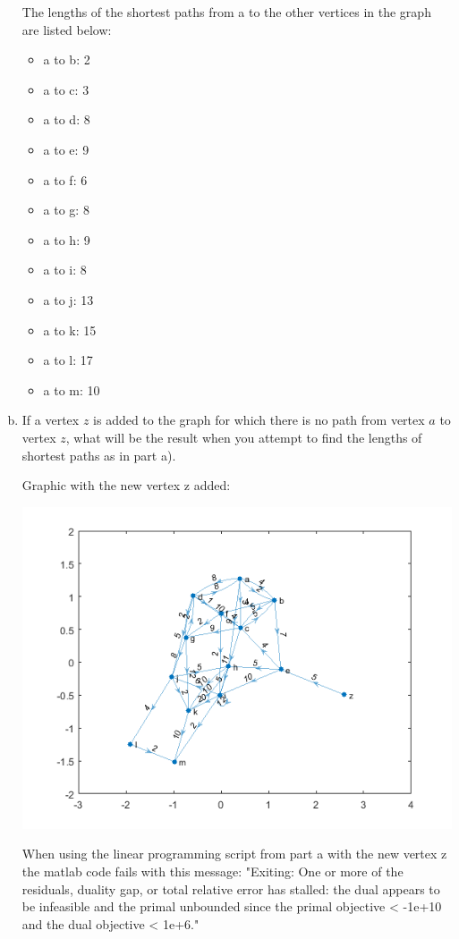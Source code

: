 \documentclass[../report/main.tex]{subfiles}
\begin{document}
\begin{enumerate}[a)]
    The lengths of the shortest paths from a to the other vertices in the graph are listed below:
    \begin{itemize}
        \item a to b: 2
        \item a to c: 3
        \item a to d: 8
        \item a to e: 9
        \item a to f: 6
        \item a to g: 8
        \item a to h: 9
        \item a to i: 8
        \item a to j: 13
        \item a to k: 15
        \item a to l: 17
        \item a to m: 10
    \end{itemize}
	\item If a vertex $z$ is added to the graph for which there is no path from vertex $a$ to vertex $z$, what will be the result when you attempt to find the lengths of shortest paths as in part a).

    Graphic with the new vertex z added:

    \includegraphics{../problem_three/img/problem3_digraph_with_z.png}

    When using the linear programming script from part a with the new vertex z the matlab code fails with this message: "Exiting: One or more of the residuals, duality gap, or total relative error
has stalled:
        the dual appears to be infeasible and the primal unbounded since
        the primal objective < -1e+10
        and the dual objective < 1e+6."


\end{enumerate}
\end{document}
